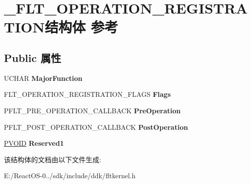\hypertarget{struct___f_l_t___o_p_e_r_a_t_i_o_n___r_e_g_i_s_t_r_a_t_i_o_n}{}\section{\+\_\+\+F\+L\+T\+\_\+\+O\+P\+E\+R\+A\+T\+I\+O\+N\+\_\+\+R\+E\+G\+I\+S\+T\+R\+A\+T\+I\+O\+N结构体 参考}
\label{struct___f_l_t___o_p_e_r_a_t_i_o_n___r_e_g_i_s_t_r_a_t_i_o_n}
\subsection*{Public 属性}
\begin{DoxyCompactItemize}
\item 
\mbox{\label{struct___f_l_t___o_p_e_r_a_t_i_o_n___r_e_g_i_s_t_r_a_t_i_o_n_a9420f4f8eb1bd089d8170eac6aedcf0b}} 
U\+C\+H\+AR {\bfseries Major\+Function}
\item 
\mbox{\label{struct___f_l_t___o_p_e_r_a_t_i_o_n___r_e_g_i_s_t_r_a_t_i_o_n_aa49c9e8d06d4360a119d9abf28c4a013}} 
F\+L\+T\+\_\+\+O\+P\+E\+R\+A\+T\+I\+O\+N\+\_\+\+R\+E\+G\+I\+S\+T\+R\+A\+T\+I\+O\+N\+\_\+\+F\+L\+A\+GS {\bfseries Flags}
\item 
\mbox{\label{struct___f_l_t___o_p_e_r_a_t_i_o_n___r_e_g_i_s_t_r_a_t_i_o_n_a15b1f94934772d36d0330083cf68dc12}} 
P\+F\+L\+T\+\_\+\+P\+R\+E\+\_\+\+O\+P\+E\+R\+A\+T\+I\+O\+N\+\_\+\+C\+A\+L\+L\+B\+A\+CK {\bfseries Pre\+Operation}
\item 
\mbox{\label{struct___f_l_t___o_p_e_r_a_t_i_o_n___r_e_g_i_s_t_r_a_t_i_o_n_a56c4a738ef0726b5987ffadcbf947ff6}} 
P\+F\+L\+T\+\_\+\+P\+O\+S\+T\+\_\+\+O\+P\+E\+R\+A\+T\+I\+O\+N\+\_\+\+C\+A\+L\+L\+B\+A\+CK {\bfseries Post\+Operation}
\item 
\mbox{\label{struct___f_l_t___o_p_e_r_a_t_i_o_n___r_e_g_i_s_t_r_a_t_i_o_n_adc9f638e45724ad3f7b285c27962baf5}} 
\hyperlink{interfacevoid}{P\+V\+O\+ID} {\bfseries Reserved1}
\end{DoxyCompactItemize}


该结构体的文档由以下文件生成\+:\begin{DoxyCompactItemize}
\item 
E\+:/\+React\+O\+S-\/0../sdk/include/ddk/fltkernel.\+h\end{DoxyCompactItemize}
